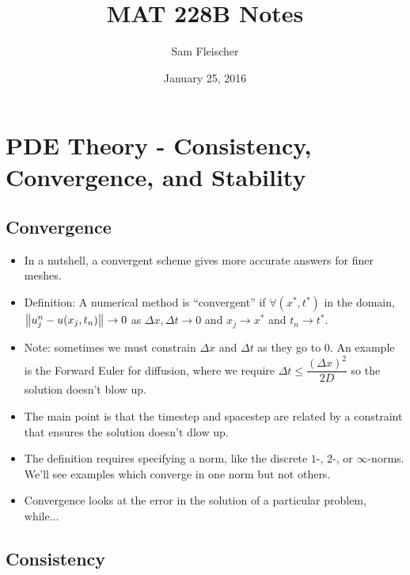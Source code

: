 \documentclass{article}
\title{MAT 228B Notes}
\author{Sam Fleischer}
\date{January 25, 2016}
\newcommand{\Dx}{\Delta x}
\newcommand{\Dt}{\Delta t}
\begin{document}
    \maketitle

    \section{PDE Theory - Consistency, Convergence, and Stability}

        \subsection{Convergence}

            \begin{itemize}
                \item In a nutshell, a convergent scheme gives more accurate answers for finer meshes.
                \item Definition: A numerical method is ``convergent'' if $\forall (x^*, t^*)$ in the domain, $\norm{u_j^n - u(x_j,t_n)} \rightarrow 0$ as $\Dx,\Dt \rightarrow 0$ and $x_j \rightarrow x^*$ and $t_n \rightarrow t^*$.
                \item Note: sometimes we must constrain $\Dx$ and $\Dt$ as they go to $0$.  An example is the Forward Euler for diffusion, where we require $\Dt \leq \dfrac{(\Dx)^2}{2D}$ so the solution doesn't blow up.
                \item The main point is that the timestep and spacestep are related by a constraint that ensures the solution doesn't dlow up.
                \item The definition requires specifying a norm, like the discrete $1$-, $2$-, or $\infty$-norms.  We'll see examples which converge in one norm but not others.
                \item Convergence looks at the error in the solution of a particular problem, while...
            \end{itemize}

        \subsection{Consistency}
\end{document}
